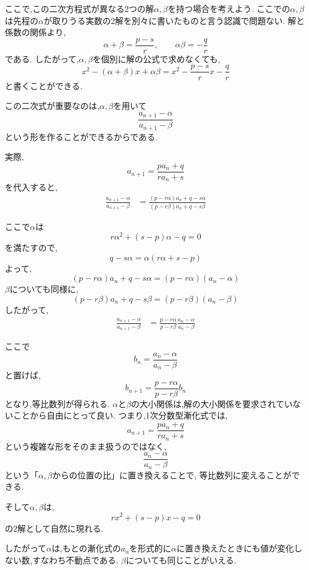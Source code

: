     ここで,この二次方程式が異なる2つの解$\alpha,\beta$を持つ場合を考えよう.
    ここでの$\alpha,\beta$は先程の$\alpha$が取りうる実数の2解を別々に書いたものと言う認識で問題ない.
    解と係数の関係より,
    \[
      \alpha+\beta=\frac{p-s}{r},
      \qquad
      \alpha\beta=-\frac qr
    \]
    である.
    したがって,$\alpha,\beta$を個別に解の公式で求めなくても,
    \[
      x^2-(\alpha+\beta)x+\alpha\beta
      =
      x^2-\frac{p-s}{r}x-\frac qr
    \]
    と書くことができる.

    この二次式が重要なのは,$\alpha,\beta$を用いて
    \[
      \frac{a_{n+1}-\alpha}{a_{n+1}-\beta}
    \]
    という形を作ることができるからである.

    実際,
    \[
      a_{n+1}=\frac{pa_n+q}{ra_n+s}
    \]
    を代入すると,
    \begin{align*}
      \frac{a_{n+1}-\alpha}{a_{n+1}-\beta}
      &=
      \frac{(p-r\alpha)a_n+q-s\alpha}{(p-r\beta)a_n+q-s\beta}
    \end{align*}
    
    ここで$\alpha$は
    \[
      r\alpha^2+(s-p)\alpha-q=0
    \]
    を満たすので,
    \[
      q-s\alpha
      =\alpha(r\alpha+s-p)
    \]
    よって,
    \[
      (p-r\alpha)a_n+q-s\alpha
      =(p-r\alpha)(a_n-\alpha)
    \]
    $\beta$についても同様に,
    \[
      (p-r\beta)a_n+q-s\beta
      =(p-r\beta)(a_n-\beta)
    \]
    したがって,
    \begin{align*}
      \frac{a_{n+1}-\alpha}{a_{n+1}-\beta}
      &=
      \frac{p-r\alpha}{p-r\beta}
      \frac{a_n-\alpha}{a_n-\beta}
    \end{align*}
    
    ここで
    \[
      b_n=\frac{a_n-\alpha}{a_n-\beta}
    \]
    と置けば,
    \[
      b_{n+1}
      =
      \frac{p-r\alpha}{p-r\beta}b_n
    \]
    となり,等比数列が得られる.
    $\alpha$と$\beta$の大小関係は,解の大小関係を要求されていないことから自由にとって良い.
    つまり,1次分数型漸化式では,
    \[
      a_{n+1}=\frac{pa_n+q}{ra_n+s}
    \]
    という複雑な形をそのまま扱うのではなく,
    \[
      \frac{a_n-\alpha}{a_n-\beta}
    \]
    という「$\alpha,\beta$からの位置の比」に置き換えることで,
    等比数列に変えることができる.

    そして$\alpha,\beta$は,
    \[
      rx^2+(s-p)x-q=0
    \]
    の2解として自然に現れる.
    
    したがって$\alpha$は,もとの漸化式の$a_n$を形式的に$\alpha$に置き換えたときにも値が変化しない数,すなわち不動点である.
    $\beta$についても同じことがいえる.
    
